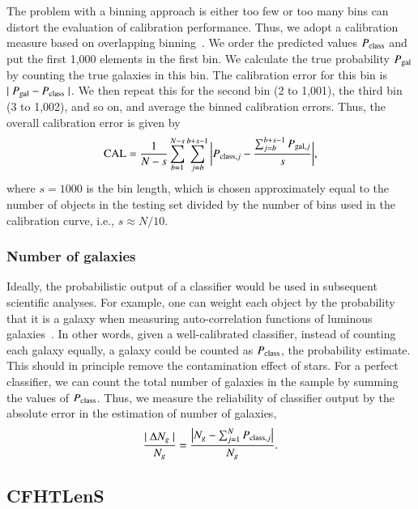 \documentclass[fleqn,usenatbib]{mnras}
\newcommand{\ie}{{i.e., }}
\begin{document}
The problem with a binning approach is either too few or too many bins
can distort the evaluation of calibration performance.
Thus, we adopt a calibration measure based on
overlapping binning~\citep{caruana2004data}.
We order the predicted values $P_{\mathrm{class}}$ and
put the first 1,000 elements in the first bin.
We calculate the true probability $P_{\mathrm{gal}}$ by counting the true galaxies
in this bin.
The calibration error for this bin is $\mid P_{\mathrm{gal}} - P_{\mathrm{class}} \mid$.
We then repeat this for the second bin (2 to 1,001),
the third bin (3 to 1,002), and so on, and average the binned calibration errors.
Thus, the overall calibration error is given by
\begin{equation}
  {\mathrm{CAL}} = \frac{1}{N-s} \sum_{b=1}^{N-s} \sum_{j=b}^{b+s-1}
  \bigg| P_{{\mathrm{class}},j} - \frac{\sum_{j=b}^{b+s-1} P_{{\mathrm{gal}},j}}{s} \bigg|,
\end{equation}
where $s=1000$ is the bin length, which is chosen approximately equal to
the number of objects in the testing set divided by the number of bins used in
the calibration curve, \ie $s \approx N / 10$.

\subsubsection{Number of galaxies}

Ideally, the probabilistic output of a classifier would be used in subsequent
scientific analyses.
For example, one can weight each object by the probability that it is a galaxy
when measuring auto-correlation functions of luminous
galaxies~\citep{ross2011ameliorating}.
In other words, given a well-calibrated classifier,
instead of counting each galaxy equally, a galaxy could be
counted as $P_{{\mathrm{class}}}$, the probability estimate.
This should in principle remove the contamination effect of stars.
For a perfect classifier, we can count the total number of galaxies in the sample
by summing the values of $P_{{\mathrm{class}}}$.
Thus, we measure the reliability of classifier output by the absolute error
in the estimation of number of galaxies,
\begin{equation}
  \frac{\mid \Delta N_g \mid}{N_g} =
  \frac{\big| N_g - \sum_{j=1}^{N} P_{{\mathrm{class}},j} \big|}{N_g}.
\end{equation}

\subsection{CFHTLenS}
  \label{sec:results_cfht}
\end{document}
